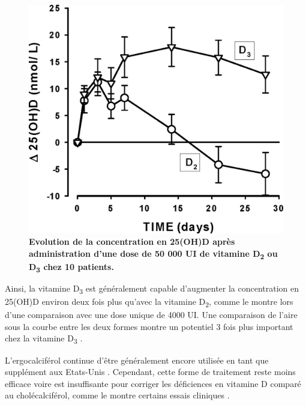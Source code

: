 \documentclass[
  a4paper,
  DIV=11,
  numbers=noendperiod,
  listof=totoc]{scrreprt}
\begin{document}
\begin{figure}

{\centering \includegraphics{figures/PK_D2_vs_D3.jpeg}

}

\caption[\textbf{Evolution de la concentration en 25(OH)D après
administration d'une dose de 50 000 UI de vitamine D\textsubscript{2} ou
D\textsubscript{3} chez 10 patients.}]{\label{fig-PK}\textbf{Evolution
de la concentration en 25(OH)D après administration d'une dose de 50 000
UI de vitamine D\textsubscript{2} ou D\textsubscript{3} chez 10
patients.} \autocite{Armas.2004}}

\end{figure}

Ainsi, la vitamine D\textsubscript{3} est généralement capable
d'augmenter la concentration en 25(OH)D environ deux fois plus qu'avec
la vitamine D\textsubscript{2}, comme le montre \textcite{Trang.1998}
lors d'une comparaison avec une dose unique de 4000 UI. Une comparaison
de l'aire sous la courbe entre les deux formes montre un potentiel 3
fois plus important chez la vitamine D\textsubscript{3}
\autocite{Armas.2004}.

L'ergocalciférol continue d'être généralement encore utilisée en tant
que supplément aux Etats-Unis \autocite{Houghton.2006}. Cependant, cette
forme de traitement reste moins efficace voire est insuffisante pour
corriger les déficiences en vitamine D comparé au cholécalciférol, comme
le montre certains essais cliniques \autocite{Boyle.2005}.
\end{document}
